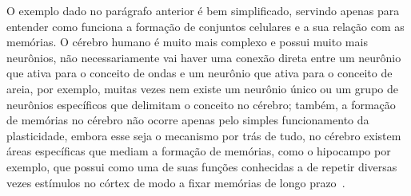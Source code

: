O exemplo dado no parágrafo anterior é bem simplificado, servindo apenas para entender como funciona a formação de conjuntos
celulares e a sua relação com as memórias. O cérebro humano é muito mais complexo e possui muito mais neurônios, não
necessariamente vai haver uma conexão direta entre um neurônio que ativa para o conceito de ondas e um neurônio que ativa para o
conceito de areia, por exemplo, muitas vezes nem existe um neurônio único ou um grupo de neurônios específicos que delimitam o
conceito no cérebro; também, a formação de memórias no cérebro não ocorre apenas pelo simples funcionamento da plasticidade,
embora esse seja o mecanismo por trás de tudo, no cérebro existem áreas específicas que mediam a formação de memórias, como o
hipocampo por exemplo, que possui como uma de suas funções conhecidas a de repetir diversas vezes estímulos no córtex de modo a
fixar memórias de longo prazo~\cite{guptaHippocampal2010}.

